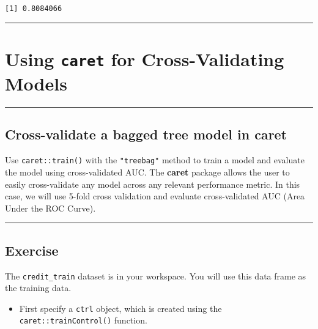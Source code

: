 \documentclass[
]{book}
\providecommand{\tightlist}{%
  \setlength{\itemsep}{0pt}\setlength{\parskip}{0pt}}
\begin{document}
\begin{verbatim}
[1] 0.8084066
\end{verbatim}

\begin{center}\rule{0.5\linewidth}{0.5pt}\end{center}

\hypertarget{using-caret-for-cross-validating-models}{%
\section{\texorpdfstring{Using \texttt{caret} for Cross-Validating Models}{Using caret for Cross-Validating Models}}\label{using-caret-for-cross-validating-models}}

\begin{center}\rule{0.5\linewidth}{0.5pt}\end{center}

\hypertarget{cross-validate-a-bagged-tree-model-in-caret}{%
\subsection{Cross-validate a bagged tree model in caret}\label{cross-validate-a-bagged-tree-model-in-caret}}

Use \texttt{caret::train()} with the \texttt{"treebag"} method to train a model and evaluate the model using cross-validated AUC. The \textbf{caret} package allows the user to easily cross-validate any model across any relevant performance metric. In this case, we will use 5-fold cross validation and evaluate cross-validated AUC (Area Under the ROC Curve).

\begin{center}\rule{0.5\linewidth}{0.5pt}\end{center}

\hypertarget{exercise-14}{%
\subsection*{Exercise}\label{exercise-14}}

The \texttt{credit\_train} dataset is in your workspace. You will use this data frame as the training data.

\begin{itemize}
\tightlist
\item
  First specify a \texttt{ctrl} object, which is created using the \texttt{caret::trainControl()} function.
\end{itemize}
\end{document}
